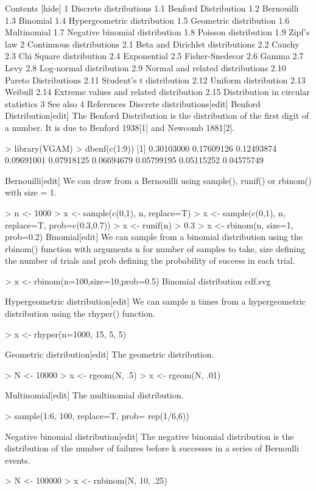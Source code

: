 \documentclass[12pt, a4paper]{article}
\theoremstyle{plain}
\theoremstyle{definition}
\theoremstyle{remark}
\begin{document}
Contents  [hide] 
1 Discrete distributions
1.1 Benford Distribution
1.2 Bernouilli
1.3 Binomial
1.4 Hypergeometric distribution
1.5 Geometric distribution
1.6 Multinomial
1.7 Negative binomial distribution
1.8 Poisson distribution
1.9 Zipf's law
2 Continuous distributions
2.1 Beta and Dirichlet distributions
2.2 Cauchy
2.3 Chi Square distribution
2.4 Exponential
2.5 Fisher-Snedecor
2.6 Gamma
2.7 Levy
2.8 Log-normal distribution
2.9 Normal and related distributions
2.10 Pareto Distributions
2.11 Student's t distribution
2.12 Uniform distribution
2.13 Weibull
2.14 Extreme values and related distribution
2.15 Distribution in circular statistics
3 See also
4 References
Discrete distributions[edit]
Benford Distribution[edit]
The Benford Distribution is the distribution of the first digit of a number. It is due to Benford 1938[1] and Newcomb 1881[2].

> library(VGAM)
> dbenf(c(1:9))
[1] 0.30103000 0.17609126 0.12493874 0.09691001 0.07918125 0.06694679 0.05799195 0.05115252 0.04575749


Bernouilli[edit]
We can draw from a Bernouilli using sample(), runif() or rbinom() with size = 1.

> n <- 1000
> x <- sample(c(0,1), n, replace=T)
> x <- sample(c(0,1), n, replace=T, prob=c(0.3,0.7))
> x <- runif(n) > 0.3
> x <- rbinom(n, size=1, prob=0.2)
Binomial[edit]
We can sample from a binomial distribution using the rbinom() function with arguments n for number of samples to take, size defining the number of trials and prob defining the probability of success in each trial.

> x <- rbinom(n=100,size=10,prob=0.5)
Binomial distribution cdf.svg


Hypergeometric distribution[edit]
We can sample n times from a hypergeometric distribution using the rhyper() function.

> x <- rhyper(n=1000, 15, 5, 5)


Geometric distribution[edit]
The geometric distribution.

> N <- 10000
> x <- rgeom(N, .5)
> x <- rgeom(N, .01)


Multinomial[edit]
The multinomial distribution.

> sample(1:6, 100, replace=T, prob= rep(1/6,6))


Negative binomial distribution[edit]
The negative binomial distribution is the distribution of the number of failures before k successes in a series of Bernoulli events.

> N <- 100000
> x <- rnbinom(N, 10, .25)
\end{document}

